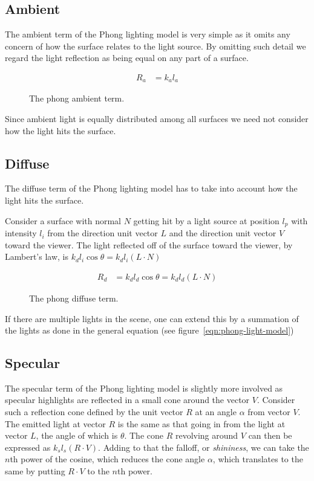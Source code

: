 \documentclass[11pt]{article}
\begin{document}
\subsection{Ambient}
The ambient term of the Phong lighting model is very simple as it omits any
concern of how the surface relates to the light source. By omitting such
detail we regard the light reflection as being equal on any part of a surface.
\begin{figure}[H]
    \begin{align}
        R_a &= k_a l_a
    \end{align}
    \caption{The phong ambient term.}
    \label{eqn:phong-ambient-term}
\end{figure}
Since ambient light is equally distributed among all surfaces we need not
consider how the light hits the surface.

\subsection{Diffuse}
The diffuse term of the Phong lighting model has to take into account how the
light hits the surface.

Consider a surface with normal $N$ getting hit by a light source at position
$l_p$ with intensity $l_i$ from the direction unit vector $L$ and the
direction unit vector $V$ toward the viewer. The light reflected off of the
surface toward the viewer, by Lambert's law, is $k_d l_i \cos \theta = k_d l_i
(L \cdot N)$

\begin{figure}[H]
    \begin{align}
        R_d &= k_d l_d \cos \theta = k_d l_d (L \cdot N)
    \end{align}
    \caption{The phong diffuse term.}
    \label{eqn:phong-diffuse-term}
\end{figure}

If there are multiple lights in the scene, one can extend this by a summation
of the lights as done in the general equation (see
figure~\ref{eqn:phong-light-model})

\subsection{Specular}
The specular term of the Phong lighting model is slightly more involved as
specular highlights are reflected in a small cone around the vector $V$.
Consider such a reflection cone defined by the unit vector $R$ at an angle
$\alpha$ from vector $V$. The emitted light at vector $R$ is the same as that
going in from the light at vector $L$, the angle of which is $\theta$. The
cone $R$ revolving around $V$ can then be expressed as $k_s l_s (R \cdot V)$.
Adding to that the falloff, or {\it shininess}, we can take the $n$th power
of the cosine, which reduces the cone angle $\alpha$, which translates to the
same by putting $R \cdot V$ to the $n$th power.
\end{document}
